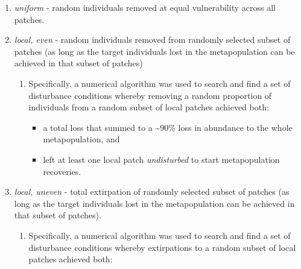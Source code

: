 \documentclass[
]{article}
\providecommand{\tightlist}{%
  \setlength{\itemsep}{0pt}\setlength{\parskip}{0pt}}
\begin{document}
\begin{enumerate}
  \begin{enumerate}
  \def\labelenumii{\alph{enumii}.}
  \tightlist
  \item
    \emph{uniform} - random individuals removed at equal vulnerability
    across all patches.
  \item
    \emph{local, even} - random individuals removed from randomly
    selected subset of patches (as long as the target individuals lost
    in the metapopulation can be achieved in that subset of patches)

    \begin{enumerate}
    \def\labelenumiii{\roman{enumiii}.}
    \tightlist
    \item
      Specifically, a numerical algorithm was used to search and find a
      set of disturbance conditions whereby removing a random proportion
      of individuals from a random subset of local patches achieved
      both:

      \begin{itemize}
      \tightlist
      \item
        a total loss that summed to a \textasciitilde90\% loss in
        abundance to the whole metapopulation, and
      \item
        left at least one local patch \emph{undisturbed} to start
        metapopulation recoveries.
      \end{itemize}
    \end{enumerate}
  \item
    \emph{local, uneven} - total extirpation of randomly selected subset
    of patches (as long as the target individuals lost in the
    metapopulation can be achieved in that subset of patches).

    \begin{enumerate}
    \def\labelenumiii{\roman{enumiii}.}
    \tightlist
    \item
      Specifically, a numerical algorithm was used to search and find a
      set of disturbance conditions whereby extirpations to a random
      subset of local patches achieved both:


\end{enumerate}
\end{enumerate}
\end{enumerate}
\end{document}

